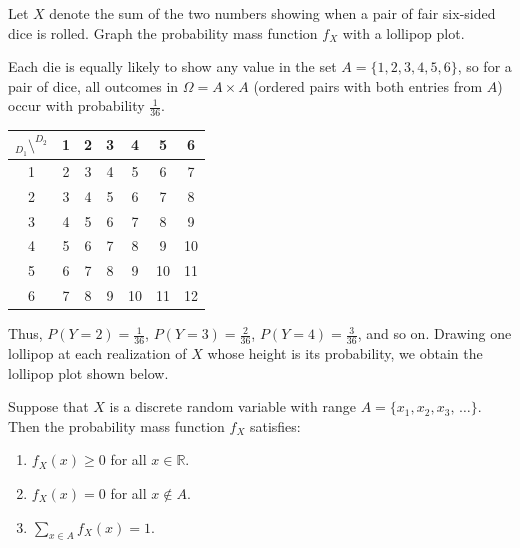 \begin{example}\label{diepairex}
Let $X$ denote the sum of the two numbers showing when a pair of fair six-sided dice is rolled. Graph the probability mass function $f_X$ with a lollipop plot.

Each die is equally likely to show any value in the set $A = \{1,2,3,4,5,6\}$, so for a pair of dice, all outcomes in $\Omega = A \times A$ (ordered pairs with both entries from $A$) occur with probability $\frac{1}{36}$. 
{\small
\begin{center}
\begin{tabular}{c|cccccc}
$_{D_1} \setminus ^{D_2}$ & 1 & 2 & 3 & 4 & 5 & 6 \\
\hline
1 & 2 & 3 & 4 & 5 & 6 & 7 \\
2 & 3 & 4 & 5 & 6 & 7 & 8 \\
3 & 4 & 5 & 6 & 7 & 8 & 9 \\
4 & 5 & 6 & 7 & 8 & 9 & $\!$10 \\
5 & 6 & 7 & 8 & 9 & $\!$10 & $\!$11 \\
6 & 7 & 8 & 9 & $\!$10 & $\!$11 & $\!$12 \\
\end{tabular}
\end{center}
}
Thus, $P(Y = 2) = \frac{1}{36}$, $P(Y = 3) = \frac{2}{36}$, $P(Y = 4) = \frac{3}{36}$, and so on. Drawing one lollipop at each realization of $X$ whose height is its probability, we obtain the lollipop plot shown below.
\begin{center}
\end{center}
\end{example} 

\begin{proposition}\label{pmfproperties} Suppose that $X$ is a discrete random variable with range $A = \{x_1, x_2, x_3, \, \dots\}$. Then the probability mass function $f_X$ satisfies:
\begin{enumerate}
\item $f_X(x) \geq 0$ for all $x \in \mathbb{R}$.
\item $f_X(x) = 0$ for all $x \not\in A$.
\item $\sum_{x \in A} f_X(x) = 1$.
\end{enumerate}
\end{proposition}

